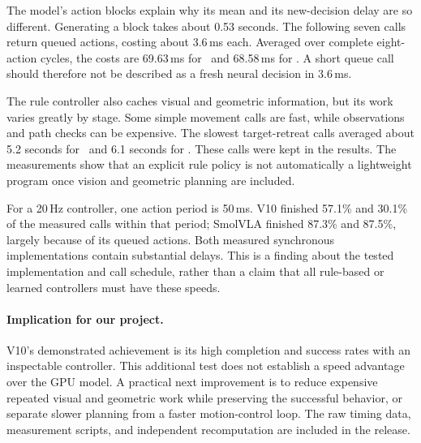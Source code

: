 The model's action blocks explain why its mean and its new-decision delay are so different. Generating a block takes about 0.53 seconds. The following seven calls return queued actions, costing about 3.6\,ms each. Averaged over complete eight-action cycles, the costs are 69.63\,ms for \pFive\ and 68.58\,ms for \pTen. A short queue call should therefore not be described as a fresh neural decision in 3.6\,ms.

The rule controller also caches visual and geometric information, but its work varies greatly by stage. Some simple movement calls are fast, while observations and path checks can be expensive. The slowest target-retreat calls averaged about 5.2 seconds for \pFive\ and 6.1 seconds for \pTen. These calls were kept in the results. The measurements show that an explicit rule policy is not automatically a lightweight program once vision and geometric planning are included.

For a 20\,Hz controller, one action period is 50\,ms. V10 finished 57.1\% and 30.1\% of the measured calls within that period; SmolVLA finished 87.3\% and 87.5\%, largely because of its queued actions. Both measured synchronous implementations contain substantial delays. This is a finding about the tested implementation and call schedule, rather than a claim that all rule-based or learned controllers must have these speeds.

\paragraph{Implication for our project.}
V10's demonstrated achievement is its high completion and success rates with an inspectable controller. This additional test does not establish a speed advantage over the GPU model. A practical next improvement is to reduce expensive repeated visual and geometric work while preserving the successful behavior, or separate slower planning from a faster motion-control loop. The raw timing data, measurement scripts, and independent recomputation are included in the release.
